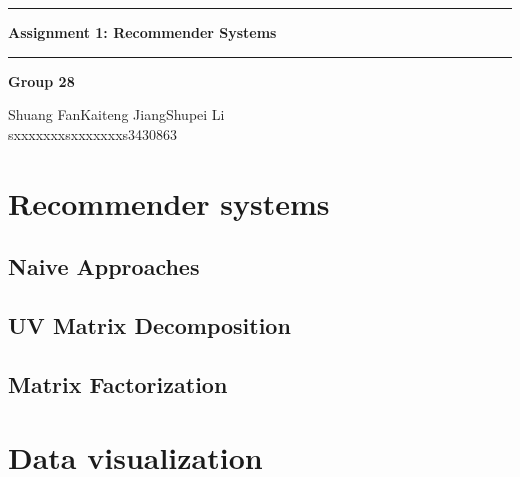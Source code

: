 \documentclass[12pt]{article}
\begin{document}
\noindent\rule{\textwidth}{1pt}
\begin{center}
    \LARGE \textbf{Assignment 1: Recommender Systems}
\end{center}
\noindent\rule{\textwidth}{0.5pt}
\begin{center}
    \textbf{Group 28}\par
    \vspace{0.3cm}
Shuang Fan\phantom{space}Kaiteng Jiang\phantom{space}Shupei Li\\
sxxxxxxx\phantom{spacespac}sxxxxxxx\phantom{spacespa}s3430863
\end{center}
\section{Recommender systems}
\subsection{Naive Approaches}

\subsection{UV Matrix Decomposition}

\subsection{Matrix Factorization}

\section{Data visualization}
\end{document}
